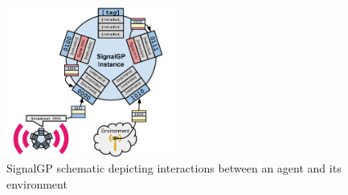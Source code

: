 \begin{figure}[h]

\centering
\includegraphics[width=0.5\textwidth]{img/signalgp-schematic}

\caption{SignalGP schematic depicting interactions between an agent and its environment}
\label{fig:signalgp-schematic;ch:influencing-cna}

\end{figure}
